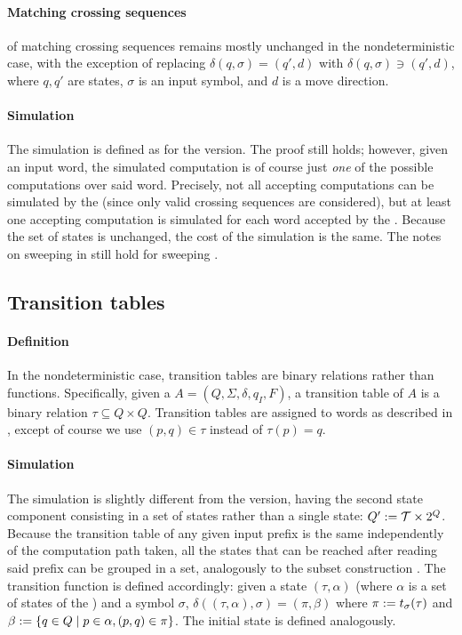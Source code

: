 \paragraph{Matching crossing sequences}  of matching crossing sequences remains mostly unchanged in the nondeterministic case, with the exception of replacing $\delta(q,\sigma)=(q',d)$ with $\delta(q,\sigma)\ni(q',d)$, where $q,q'$ are states, $\sigma$ is an input symbol, and $d$ is a move direction.

\paragraph{Simulation} The simulation is defined as for the \TDFA version.
The proof still holds; however, given an input word, the simulated computation is of course just \emph{one} of the possible computations over said word.
Precisely, not all accepting computations can be simulated by the \ONFA (since only valid crossing sequences are considered), but at least one accepting computation is simulated for each word accepted by the \TNFA.
Because the set of states is unchanged, the cost of the simulation is the same.
The notes on sweeping \TDFA in  still hold for sweeping \TNFA.


\subsection{Transition tables}

\paragraph{Definition} In the nondeterministic case, transition tables are binary relations rather than functions.
Specifically, given a \TNFA $A=(Q,\Sigma,\delta,q_I,F)$, a transition table of $A$ is a binary relation $\tau\subseteq Q\times Q$.
Transition tables are assigned to words as described in , except of course we use $(p,q)\in\tau$ instead of $\tau(p)=q$.

\paragraph{Simulation} The simulation is slightly different from the \TDFA version, having the second state component consisting in a set of states rather than a single state: $Q':=\mathcal T\times2^{Q}$.
Because the transition table of any given input prefix is the same independently of the computation path taken, all the states that can be reached after reading said prefix can be grouped in a set, analogously to the subset construction \cite{RabSco59,HopUll79}.
The transition function is defined accordingly: given a state $(\tau,\alpha)$ (where $\alpha$ is a set of states of the \TNFA) and a symbol $\sigma$, $\delta((\tau,\alpha),\sigma)=(\pi,\beta)$ where $\pi:=t_\sigma(\tau)$ and $\beta:=\{q\in Q\mid p\in\alpha, (p,q)\in\pi\}$.
The initial state is defined analogously.

